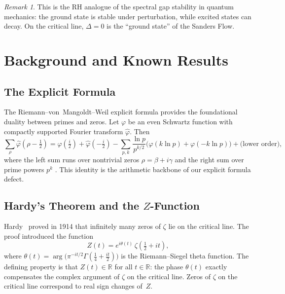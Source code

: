 \documentclass[11pt]{article}
\theoremstyle{remark}
\newtheorem{remark}[theorem]{Remark}
\begin{document}
\begin{remark}
This is the RH analogue of the spectral gap stability in quantum mechanics: the
ground state is stable under perturbation, while excited states can decay. On the
critical line, $\Delta = 0$ is the ``ground state'' of the Sanders Flow.
\end{remark}

\section{Background and Known Results}
\label{sec:background}

\subsection{The Explicit Formula}

The Riemann--von~Mangoldt--Weil explicit formula provides the foundational duality
between primes and zeros.
Let $\varphi$ be an even Schwartz function with compactly supported Fourier
transform $\hat{\varphi}$.
Then
\begin{equation}\label{eq:explicit}
  \sum_{\rho}\hat{\varphi}\!\left(\rho-\tfrac{1}{2}\right)
  = \hat{\varphi}\!\left(\tfrac{i}{2}\right) + \hat{\varphi}\!\left(-\tfrac{i}{2}\right)
  - \sum_{p,k} \frac{\ln p}{p^{k/2}}
    \bigl(\varphi(k\ln p)+\varphi(-k\ln p)\bigr)
  + \text{(lower order)},
\end{equation}
where the left sum runs over nontrivial zeros $\rho=\beta+i\gamma$ and the right sum
over prime powers $p^k$ \cite{IK}.
This identity is the arithmetic backbone of our explicit formula defect.

\subsection{Hardy's Theorem and the $Z$-Function}

Hardy~\cite{Hardy} proved in 1914 that infinitely many zeros of $\zeta$ lie on the
critical line.
The proof introduced the function
\begin{equation}\label{eq:hardy-z}
  Z(t) = e^{i\theta(t)}\,\zeta\!\left(\tfrac{1}{2}+it\right),
\end{equation}
where $\theta(t)=\arg\!\bigl(\pi^{-it/2}\Gamma(\tfrac{1}{4}+\tfrac{it}{2})\bigr)$
is the Riemann--Siegel theta function.
The defining property is that $Z(t)\in\mathbb{R}$ for all $t\in\mathbb{R}$: the
phase $\theta(t)$ exactly compensates the complex argument of $\zeta$ on the critical
line.
Zeros of $\zeta$ on the critical line correspond to real sign changes of~$Z$.
\end{document}
